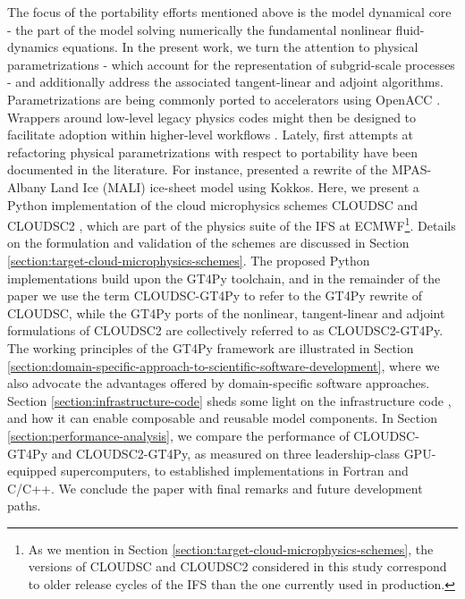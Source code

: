 \documentclass[gmd,manuscript,online]{copernicus}
\begin{document}
	The focus of the portability efforts mentioned above is the model dynamical core - the part of the model solving numerically the fundamental nonlinear fluid-dynamics equations. In the present work, we turn the attention to physical parametrizations - which account for the representation of subgrid-scale processes - and additionally address the associated tangent-linear and adjoint algorithms. Parametrizations are being commonly ported to accelerators using OpenACC \citep[e.g., ][]{fuhrer14, yang19, kim21}. Wrappers around low-level legacy physics codes might then be designed to facilitate adoption within higher-level workflows \citep{monteiro18, mcgibbon21}. Lately, first attempts at refactoring physical parametrizations with respect to portability have been documented in the literature. For instance, \citet{watkins23} presented a rewrite of the MPAS-Albany Land Ice (MALI) ice-sheet model using Kokkos. Here, we present a Python implementation of the cloud microphysics schemes CLOUDSC \citep{gt4py-dwarf-p-cloudsc} and CLOUDSC2 \citep{gt4py-dwarf-p-cloudsc2-tl-ad}, which are part of the physics suite of the IFS at ECMWF\footnote{As we mention in Section \ref{section:target-cloud-microphysics-schemes}, the versions of CLOUDSC and CLOUDSC2 considered in this study correspond to older release cycles of the IFS than the one currently used in production.}. Details on the formulation and validation of the schemes are discussed in Section \ref{section:target-cloud-microphysics-schemes}. The proposed Python implementations build upon the GT4Py toolchain, and in the remainder of the paper we use the term CLOUDSC-GT4Py to refer to the GT4Py rewrite of CLOUDSC, while the GT4Py ports of the nonlinear, tangent-linear and adjoint formulations of CLOUDSC2 are collectively referred to as CLOUDSC2-GT4Py. The working principles of the GT4Py framework are illustrated in Section \ref{section:domain-specific-approach-to-scientific-software-development}, where we also advocate the advantages offered by domain-specific software approaches. Section \ref{section:infrastructure-code} sheds some light on the infrastructure code \citep{ifs-physics-common}, and how it can enable composable and reusable model components. In Section \ref{section:performance-analysis}, we compare the performance of CLOUDSC-GT4Py and CLOUDSC2-GT4Py, as measured on three leadership-class GPU-equipped supercomputers, to established implementations in Fortran and C/C++. We conclude the paper with final remarks and future development paths.

\end{document}
